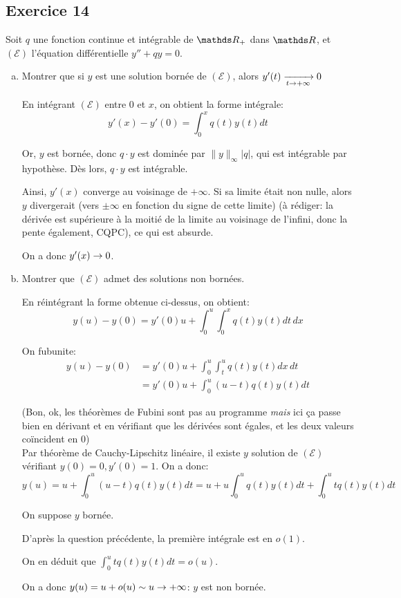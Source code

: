\documentclass[a4paper, 12pt]{article}
\begin{document}
	\maketitle
	
	\subsection*{Exercice 14}
	Soit $q$ une fonction continue et intégrable de $\R_+$ dans $\R$, et $(\mathcal E)$ l'équation différentielle $y'' +qy = 0$.
	\begin{enumerate}[a)]
		\item Montrer que si $y$ est une solution bornée de $(\mathcal E)$, alors $y'(t) \cv[t\rightarrow +\infty] 0$
		\begin{corr}
			En intégrant $(\mathcal E)$ entre 0 et $x$, on obtient la forme intégrale:
			$$ y'(x) - y'(0) = \int_{0}^{x} q(t)y(t) dt $$
			
			Or, $y$ est bornée, donc $q \cdot y$ est dominée par $\|y\|_\infty |q|$, qui est intégrable par hypothèse. Dès lors, $q \cdot y$ est intégrable.
			
			Ainsi, $y'(x)$ converge au voisinage de $+\infty$. Si sa limite était non nulle, alors $y$ divergerait (vers $\pm \infty$ en fonction du signe de cette limite) (à rédiger: la dérivée est supérieure à la moitié de la limite au voisinage de l'infini, donc la pente également, CQPC), ce qui est absurde.
			
			On a donc $y'(x) \cv 0$. 
		\end{corr}
		
		\item Montrer que $(\mathcal E)$ admet des solutions non bornées.
		
		\begin{corr}
			En réintégrant la forme obtenue ci-dessus, on obtient:
			$$ y(u) -y(0) = y'(0)u + \int_0^u \int_0^x q(t)y(t)dt\, dx$$
			
			On fubunite:
			\begin{align*}
				y(u) -y(0) & = y'(0)u + \int_0^u \int_t^u q(t)y(t)dx\, dt \\
				& =  y'(0)u + \int_0^u (u-t) q(t)y(t) dt
			\end{align*}
			
			(Bon, ok, les théorèmes de Fubini sont pas au programme \textit{mais} ici ça passe bien en dérivant et en vérifiant que les dérivées sont égales, et les deux valeurs coïncident en 0) \\
			
			Par théorème de Cauchy-Lipschitz linéaire, il existe $y$ solution de $(\mathcal E)$ vérifiant $y(0)=0, y'(0)=1$. On a donc:
			$$y(u) = u + \int_0^u (u-t)q(t)y(t) dt = u + u\int_0^u q(t)y(t) dt + \int_0^u tq(t)y(t) dt$$
			
			On suppose $y$ bornée.
			
			D'après la question précédente, la première intégrale est en $o(1)$.
			
			On en déduit que $\displaystyle \int_0^u tq(t)y(t) dt = o(u)$.
			
			On a donc $y(u) = u + o(u) \sim u \cv +\infty$: $y$ est non bornée.
		\end{corr}
	\end{enumerate}
	
\end{document}
